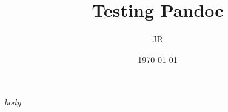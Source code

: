 \documentclass[9pt]{article}
\title{Testing Pandoc}
\author{JR}
\date{\today}
\begin{document}
\maketitle
\tableofcontents
\newpage


$body$
\end{document}

